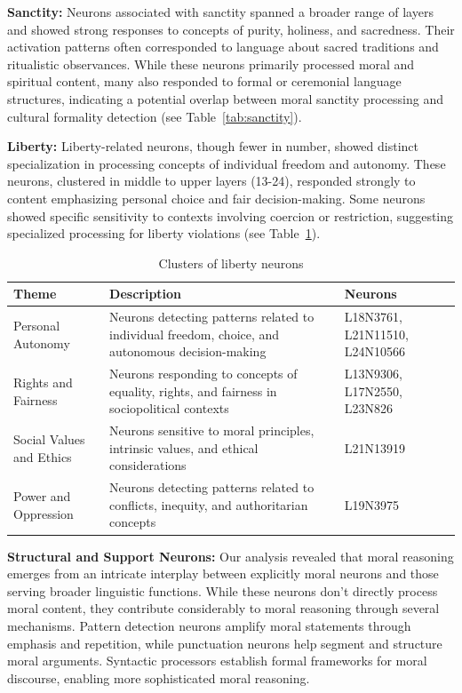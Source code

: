 \documentclass[runninghheads]{llncs}
\begin{document}
\textbf{Sanctity:} Neurons associated with sanctity spanned a broader range of layers and showed strong responses to concepts of purity, holiness, and sacredness. Their activation patterns often corresponded to language about sacred traditions and ritualistic observances. While these neurons primarily processed moral and spiritual content, many also responded to formal or ceremonial language structures, indicating a potential overlap between moral sanctity processing and cultural formality detection (see Table~\ref{tab:sanctity}).



\textbf{Liberty:} Liberty-related neurons, though fewer in number, showed distinct specialization in processing concepts of individual freedom and autonomy. These neurons, clustered in middle to upper layers (13-24), responded strongly to content emphasizing personal choice and fair decision-making. Some neurons showed specific sensitivity to contexts involving coercion or restriction, suggesting specialized processing for liberty violations (see Table~\ref{tab:liberty}).



\begin{table}[!tb]
    \centering
    \begin{tabular}{|p{3cm}|p{5.5cm}|p{3.5cm}|}
    \hline
        \textbf{Theme} & \textbf{Description} & \textbf{Neurons} \\ \hline
        Personal Autonomy & Neurons detecting patterns related to individual freedom, choice, and autonomous decision-making & L18N3761, L21N11510, L24N10566 \\ \hline
        Rights and Fairness & Neurons responding to concepts of equality, rights, and fairness in sociopolitical contexts & L13N9306, L17N2550, L23N826 \\ \hline
        Social Values and Ethics & Neurons sensitive to moral principles, intrinsic values, and ethical considerations & L21N13919 \\ \hline
        Power and Oppression & Neurons detecting patterns related to conflicts, inequity, and authoritarian concepts & L19N3975 \\ \hline
    \end{tabular}
    \caption{Clusters of liberty neurons}
    \label{tab:liberty}
\end{table}




\textbf{Structural and Support Neurons:} Our analysis revealed that moral reasoning emerges from an intricate interplay between explicitly moral neurons and those serving broader linguistic functions. While these neurons don't directly process moral content, they contribute considerably to moral reasoning through several mechanisms. Pattern detection neurons amplify moral statements through emphasis and repetition, while punctuation neurons help segment and structure moral arguments. Syntactic processors establish formal frameworks for moral discourse, enabling more sophisticated moral reasoning.
\end{document}
